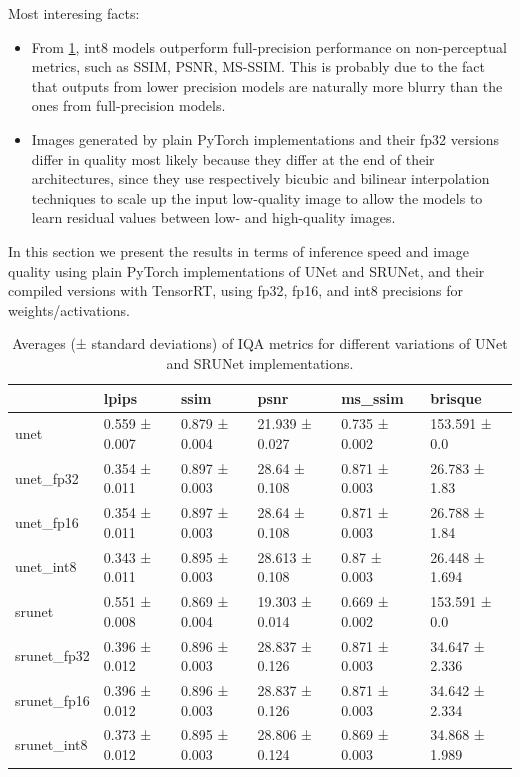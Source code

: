\label{chap:Experiments}

Most interesing facts:
\begin{itemize}
\item{
  From \cref{tab:tab1}, int8 models outperform full-precision performance on non-perceptual metrics, such as SSIM, PSNR, MS-SSIM. This is probably due to the fact that outputs from lower precision models are naturally more blurry than the ones from full-precision models.
}

\item{
  Images generated by plain PyTorch implementations and their fp32 versions differ in quality most likely because they differ at the end of their architectures, since they use respectively bicubic and bilinear interpolation techniques to scale up the input low-quality image to allow the models to learn residual values between low- and high-quality images.
}
\end{itemize}
\pagebreak

In this section we present the results in terms of inference speed and image quality using plain PyTorch implementations of UNet and SRUNet, and their compiled versions with TensorRT, using fp32, fp16, and int8 precisions for weights/activations.

\begin{table}[t]
\begin{tabular}{llllll}
\toprule
{} &          lpips &           ssim &            psnr &        ms\_ssim &         brisque \\
\midrule
unet        &  0.559 ± 0.007 &  0.879 ± 0.004 &  21.939 ± 0.027 &  0.735 ± 0.002 &   153.591 ± 0.0 \\
unet\_fp32   &  0.354 ± 0.011 &  0.897 ± 0.003 &   28.64 ± 0.108 &  0.871 ± 0.003 &   26.783 ± 1.83 \\
unet\_fp16   &  0.354 ± 0.011 &  0.897 ± 0.003 &   28.64 ± 0.108 &  0.871 ± 0.003 &   26.788 ± 1.84 \\
unet\_int8   &  0.343 ± 0.011 &  0.895 ± 0.003 &  28.613 ± 0.108 &   0.87 ± 0.003 &  26.448 ± 1.694 \\
srunet      &  0.551 ± 0.008 &  0.869 ± 0.004 &  19.303 ± 0.014 &  0.669 ± 0.002 &   153.591 ± 0.0 \\
srunet\_fp32 &  0.396 ± 0.012 &  0.896 ± 0.003 &  28.837 ± 0.126 &  0.871 ± 0.003 &  34.647 ± 2.336 \\
srunet\_fp16 &  0.396 ± 0.012 &  0.896 ± 0.003 &  28.837 ± 0.126 &  0.871 ± 0.003 &  34.642 ± 2.334 \\
srunet\_int8 &  0.373 ± 0.012 &  0.895 ± 0.003 &  28.806 ± 0.124 &  0.869 ± 0.003 &  34.868 ± 1.989 \\
\bottomrule
\end{tabular}
\caption{Averages (± standard deviations) of IQA metrics for different variations of UNet and SRUNet implementations.}
\label{tab:tab1}
\end{table}

